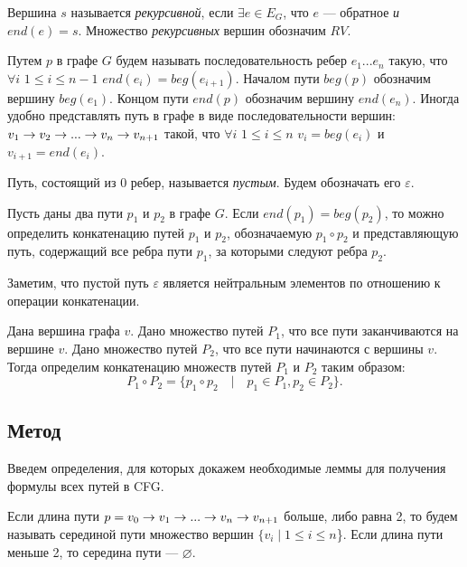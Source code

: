 \begin{defn}\label{recursiveVertex}
Вершина $s$ называется \emph{рекурсивной}, если $\exists e \in E_G$, что $e$ --- обратное \emph{и} $end(e) = s$. 
Множество \emph{рекурсивных} вершин обозначим $RV$.
\end{defn}

\begin{defn}
Путем $p$ в графе $G$ будем называть последовательность ребер $e_1...e_n$ такую,
что $\forall i$ $ 1 \leq i \leq n - 1$ $end(e_i) = beg(e_{i+1})$.
Началом пути $beg(p)$ обозначим вершину $beg(e_1)$.
Концом пути $end(p)$ обозначим вершину $end(e_n)$.
Иногда удобно представлять путь в графе в виде последовательности вершин:
$v_1 \rightarrow v_2 \rightarrow ... \rightarrow v_n \rightarrow v_{n + 1}$ такой, что $\forall i$ $1 \leq i \leq n$ $v_i = beg(e_i)$ и $v_{i+1} = end(e_i)$.
\end{defn}

\begin{defn}
Путь, состоящий из 0 ребер, называется \emph{пустым}.
Будем обозначать его $\varepsilon$.
\end{defn}

\begin{defn}
Пусть даны два пути $p_1$ и $p_2$ в графе $G$.
Если $end(p_1) = beg(p_2)$, то можно определить конкатенацию путей $p_1$ и $p_2$, обозначаемую $p_1 \circ p_2$ и представляющую путь, содержащий все ребра пути $p_1$, за которыми следуют ребра $p_2$.

Заметим, что пустой путь $\varepsilon$ является нейтральным элементов по отношению к операции конкатенации.
\end{defn}

\begin{defn}
Дана вершина графа $v$.
Дано множество путей $P_1$, что все пути заканчиваются на вершине $v$.
Дано множество путей $P_2$, что все пути начинаются с вершины $v$.
Тогда определим конкатенацию множеств путей $P_1$ и $P_2$ таким образом:
$$P_1 \circ P_2 = \{p_1 \circ p_2 \quad | \quad p_1 \in P_1, p_2 \in P_2 \}.$$
\end{defn}

\subsection{Метод}
Введем определения, для которых докажем необходимые леммы для получения формулы всех путей в CFG.


\begin{defn}
Если длина пути $p = v_0 \rightarrow v_1 \rightarrow ... \rightarrow v_n \rightarrow v_{n+1}$ больше, либо равна 2, то будем называть серединой пути множество вершин 
$\{v_i \mid 1 \leq i \leq n$\}. Если длина пути меньше 2, то середина пути --- $\varnothing$.
\end{defn}

